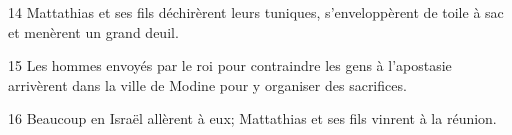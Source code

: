 
14 Mattathias et ses fils déchirèrent leurs tuniques, s’enveloppèrent de toile à sac et menèrent un grand deuil.

15 Les hommes envoyés par le roi pour contraindre les gens à l’apostasie arrivèrent dans la ville de Modine pour y organiser des sacrifices.

16 Beaucoup en Israël allèrent à eux; Mattathias et ses fils vinrent à la réunion.